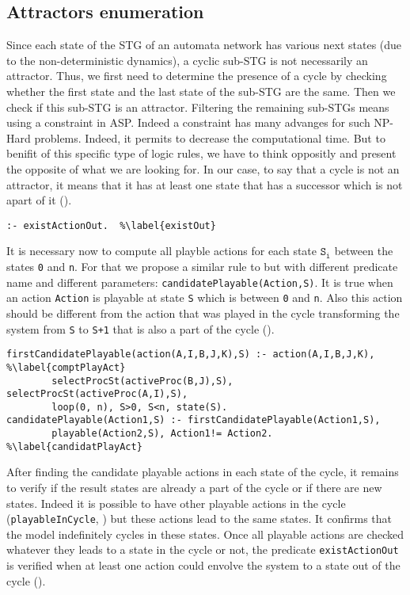 \subsection{Attractors enumeration}
Since each state of the STG of an automata network has various next states (due to the non-deterministic dynamics), a cyclic sub-STG is not necessarily an attractor. Thus, we first need to determine the presence of a cycle by checking whether the first state and the last state of the sub-STG are the same. Then we check if this sub-STG is an attractor. 
Filtering the remaining sub-STGs means using a constraint in ASP. Indeed a constraint has many advanges for such NP-Hard problems. Indeed, it permits to decrease the computational time. But to benifit of this specific type of logic rules, we have to think oppositly and present the opposite of what we are looking for. 
In our case, to say that a cycle is not an attractor, it means that it has at least one state that has a successor which is not apart of it ().
\begin{lstlisting}
:- existActionOut.  %\label{existOut}
\end{lstlisting}
It is necessary now to compute all playble actions for each state $\texttt{S}_\texttt{i}$ between the states \texttt{0} and \texttt{n}. For that we propose a similar rule to  but with different predicate name and different parameters: \texttt{candidatePlayable(Action,S)}. It is true when an action \texttt{Action} is playable at state \texttt{S} which is between \texttt{0} and \texttt{n}. Also this action should be different from the action that was played in the cycle transforming the system from \texttt{S} to \texttt{S+1} that is also a part of the cycle ().
\begin{lstlisting}
firstCandidatePlayable(action(A,I,B,J,K),S) :- action(A,I,B,J,K), %\label{comptPlayAct}
		selectProcSt(activeProc(B,J),S), selectProcSt(activeProc(A,I),S), 
		loop(0, n), S>0, S<n, state(S).		
candidatePlayable(Action1,S) :- firstCandidatePlayable(Action1,S), 
		playable(Action2,S), Action1!= Action2.	%\label{candidatPlayAct}
\end{lstlisting}
After finding the candidate playable actions in each state of the cycle, it remains to verify if the result states are already a part of the cycle or if there are new states. Indeed it is possible to have other playable actions in the cycle (\texttt{playableInCycle}, ) but these actions lead to the same states. It confirms that the model indefinitely cycles in these states. Once all playable actions are checked whatever they leads to a state in the cycle or not, the predicate \texttt{existActionOut} is verified when at least one action could envolve the system to a state out of the cycle ().
